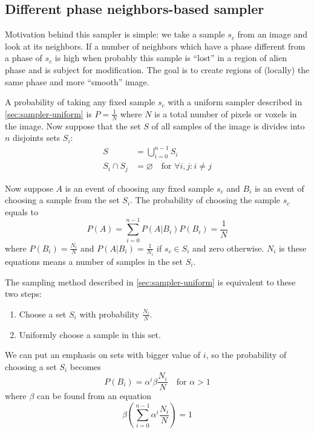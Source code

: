 \documentclass[preprint,amsmath,amssymb,aps,pre]{revtex4-1}
\begin{document}
\subsection{Different phase neighbors-based sampler}
\label{sec:sampler-dpn}
Motivation behind this sampler is simple: we take a sample $s_c$ from an image
and look at its neighbors. If a number of neighbors which have a phase different
from a phase of $s_c$ is high when probably this sample is ``lost'' in a region
of alien phase and is subject for modification. The goal is to create regions of
(locally) the same phase and more ``smooth'' image.

A probability of taking any fixed sample $s_c$ with a uniform sampler described
in \cref{sec:sampler-uniform} is $P = \frac{1}{N}$ where $N$ is a total number
of pixels or voxels in the image. Now suppose that the set $S$ of all samples of
the image is divides into $n$ disjoints sets $S_i$:
\begin{align*}
  S &= \bigcup_{i=0}^{n-1} S_i \\
  S_i \cap S_j &= \varnothing \quad \text{for } \forall i,j: i \ne j
\end{align*}

Now suppose $A$ is an event of choosing any fixed sample $s_c$ and $B_i$ is an
event of choosing a sample from the set $S_i$. The probability of choosing the
sample $s_c$ equals to
\begin{equation*}
  P(A) = \sum_{i = 0}^{n-1} P(A|B_i) P(B_i) = \frac{1}{N}
\end{equation*}
where $P(B_i) = \frac{N_i}{N}$ and $P(A|B_i) = \frac{1}{N_i}$ if $s_c \in S_i$
and zero otherwise. $N_i$ is these equations means a number of samples in the
set $S_i$.

The sampling method described in \cref{sec:sampler-uniform} is equivalent to
these two steps:
\begin{enumerate}
\item Choose a set $S_i$ with probability $\frac{N_i}{N}$.
\item Uniformly choose a sample in this set.
\end{enumerate}
We can put an emphasis on sets with bigger value of $i$, so the probability of
choosing a set $S_i$ becomes
\begin{equation}
  P(B_i) = \alpha^i \beta \frac{N_i}{N} \quad \text{for } \alpha > 1 \label{eq:prob-dpn}
\end{equation}
where $\beta$ can be found from an equation
\begin{equation*}
  \beta (\sum_{i=0}^{n-1} \alpha^i \frac{N_i}{N}) = 1
\end{equation*}
\end{document}
